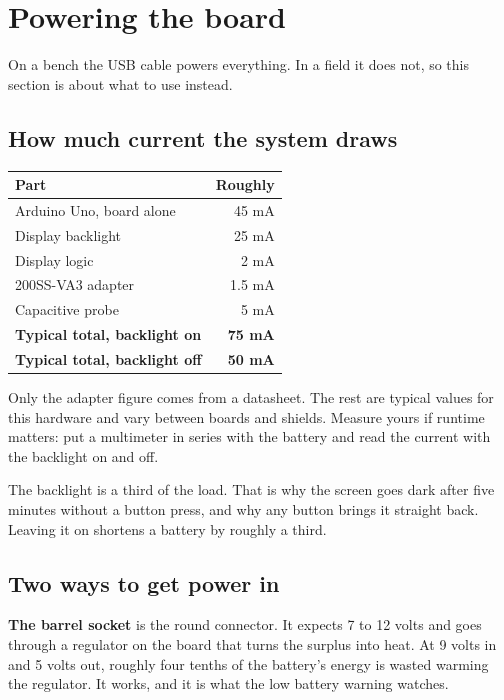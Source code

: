\documentclass[11pt,a4paper]{article}
\newenvironment{note}
  {\par\medskip\noindent
   \begin{lrbox}{\nfbox}\begin{minipage}{0.94\linewidth}\vspace{2pt}}
  {\vspace{2pt}\end{minipage}\end{lrbox}%
   \fcolorbox{leaf}{paper}{\usebox{\nfbox}}\par\medskip}
\begin{document}
\section{Powering the board}
\label{sec:power}

On a bench the USB cable powers everything. In a field it does not, so this
section is about what to use instead.

\subsection{How much current the system draws}

\begin{center}
\begin{tabular}{lr}
\hline
\textbf{Part} & \textbf{Roughly} \\
\hline
Arduino Uno, board alone & 45 mA \\
Display backlight & 25 mA \\
Display logic & 2 mA \\
200SS-VA3 adapter & 1.5 mA \\
Capacitive probe & 5 mA \\
\hline
\textbf{Typical total, backlight on} & \textbf{75 mA} \\
\textbf{Typical total, backlight off} & \textbf{50 mA} \\
\hline
\end{tabular}
\end{center}

Only the adapter figure comes from a datasheet. The rest are typical values for
this hardware and vary between boards and shields. Measure yours if runtime
matters: put a multimeter in series with the battery and read the current with
the backlight on and off.

\begin{note}
The backlight is a third of the load. That is why the screen goes dark after
five minutes without a button press, and why any button brings it straight
back. Leaving it on shortens a battery by roughly a third.
\end{note}

\subsection{Two ways to get power in}

\textbf{The barrel socket} is the round connector. It expects 7 to 12 volts and
goes through a regulator on the board that turns the surplus into heat. At 9
volts in and 5 volts out, roughly four tenths of the battery's energy is wasted
warming the regulator. It works, and it is what the low battery warning
watches.
\end{document}
